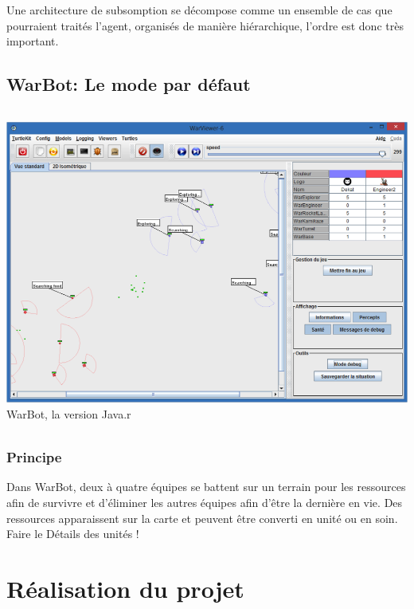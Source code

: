 \documentclass{report}
\begin{document}
Une architecture de subsomption se décompose comme un ensemble de cas que pourraient traités l’agent, organisés de manière hiérarchique, l’ordre est donc très important.

\newpage
\chapter{WarBot: Le mode par défaut}

\paragraph{}
\begin{center}
\includegraphics[scale=0.7]{DATA/warbotjava.png}
 {WarBot, la version Java.r}
\end{center}
\paragraph{}

\section{Principe}
Dans WarBot, deux à quatre équipes se battent sur un terrain pour les ressources afin de survivre et d'éliminer les autres équipes afin d’être la dernière en vie. Des ressources apparaissent sur la carte et peuvent être converti en unité ou en soin.
 Faire le Détails des unités !
\newpage
\part{Réalisation du projet}
\newpage
\end{document}
